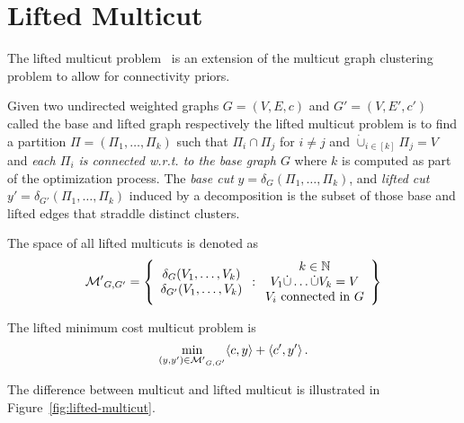 \section{Lifted Multicut}
\label{sec:lifted-multicut}

The lifted multicut problem~\cite{keuper2015efficient} is an extension of the multicut graph clustering problem to allow for connectivity priors.

\begin{definition}
Given two undirected weighted graphs $G=(V,E,c)$ and $G'=(V,E',c')$  called the base and lifted graph respectively the lifted multicut problem is to find a partition $\Pi = (\Pi_1,\ldots,\Pi_k)$ such that $\Pi_i \cap \Pi_j$ for $i \neq j$ and $\dot{\cup}_{i\in[k]} \Pi_j = V$ and \emph{each $\Pi_i$ is connected w.r.t. to the base graph $G$} where $k$ is computed as part of the optimization process.
The \emph{base cut} $y=\delta_G(\Pi_1,\ldots,\Pi_k)$, and \emph{lifted cut} $y' = \delta_{G'}(\Pi_1,\ldots,\Pi_k)$ induced by a decomposition is the subset of those base and lifted edges that straddle distinct clusters.

The space of all lifted multicuts is denoted as
\begin{equation}
  \mathcal{M'}_{G,G'} = \left\{ \begin{array}{c}\delta_G(V_1,\ldots,V_k)\\ \delta_{G'}(V_1,\ldots,V_k) \end{array} : 
\begin{array}{c}
  k \in \N \\
  V_1 \dot\cup \ldots \dot\cup V_k = V\\
  V_i \text{ connected in } G
\end{array} \right\}%
\end{equation} 

The lifted minimum cost multicut problem is
\begin{equation}
  \label{eq:lifted-multicut}
  \min_{(y,y') \in \mathcal{M'}_{G,G'}} \langle c, y \rangle + \langle c', y' \rangle\,.
\end{equation} 
\end{definition}

The difference between multicut and lifted multicut is illustrated in Figure~\ref{fig:lifted-multicut}.

